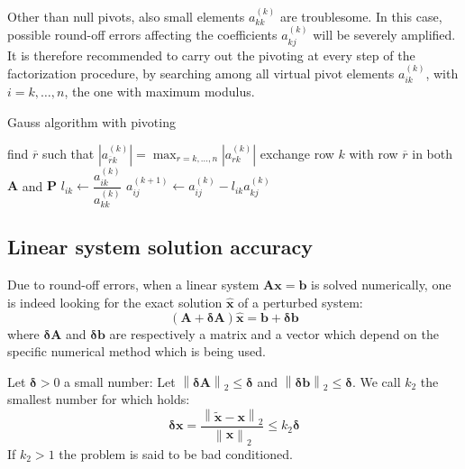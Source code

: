 \documentclass[12pt, a4paper]{report}
\newtheorem[style=M,bodystyle=\normalfont]{theorem}{Theorem}
\newtheorem[style=M,bodystyle=\normalfont]{proposition}{Proposition}
\newtheorem[style=M,bodystyle=\normalfont]{corollary}{Corollary}
\newtheorem[style=M,bodystyle=\normalfont]{lemma}{Lemma}
\newtheorem[style=M,bodystyle=\normalfont]{definition}{Definition}
\begin{document}
    Other than null pivots, also small elements $a_{kk}^{(k)}$ are troublesome. In this case, possible round-off errors affecting the 
    coefficients $a_{kj}^{(k)}$ will be severely amplified. It is therefore recommended to carry out the pivoting at every step of the
    factorization procedure, by searching among all virtual pivot elements $a_{ik}^{(k)}$, with $i=k,\dots,n$, the one with maximum 
    modulus. 
    \begin{algorithm}[H]
        \caption{Gauss algorithm with pivoting}
            \begin{algorithmic}[1]
                    \State find $\overline{r}$ such that $\left\lvert a_{\overline{r}k}^{(k)} \right\rvert=\max_{r=k,\dots,n}\left\lvert a_{rk}^{(k)} \right\rvert$
                    \State exchange row $k$ with row $\overline{r}$ in both $\boldsymbol{A}$ and $\boldsymbol{P}$
                        \State $l_{ik} \leftarrow \dfrac{a_{ik}^{(k)}}{a_{kk}^{(k)}}$
                            \State $a_{ij}^{(k+1)} \leftarrow a_{ij}^{(k)}-l_{ik}a_{kj}^{(k)}$
                        \EndFor
                    \EndFor
                \EndFor
            \end{algorithmic}
    \end{algorithm}

    \subsection{Linear system solution accuracy}
    Due to round-off errors, when a linear system $\boldsymbol{Ax}=\boldsymbol{b}$ is solved numerically, one is indeed looking for the 
    exact solution $\widehat{\boldsymbol{x}}$ of a perturbed system: 
    \[\left( \boldsymbol{A} + \boldsymbol{\delta A}\right)\widehat{\boldsymbol{x}}=\boldsymbol{b}+\boldsymbol{\delta b}\]
    where $\boldsymbol{\delta A}$ and $\boldsymbol{\delta b}$ are respectively a matrix and a vector which depend on the specific 
    numerical method which is being used. 

    Let $\boldsymbol{\delta}>0$ a small number: Let $\left\lVert \boldsymbol{\delta A} \right\rVert_2 \leq \boldsymbol{\delta}$ and 
    $\left\lVert \boldsymbol{\delta b} \right\rVert_2 \leq \boldsymbol{\delta}$. We call $k_2$ the smallest number for which holds: 
    \[\boldsymbol{\delta x}=\dfrac{\left\lVert \widetilde{\boldsymbol{x}}-\boldsymbol{x} \right\rVert_2}{\left\lVert \boldsymbol{x} \right\rVert_2} \leq k_2 \boldsymbol{\delta}\]
    If $k_2 > 1$ the problem is said to be bad conditioned. 
\end{document}
